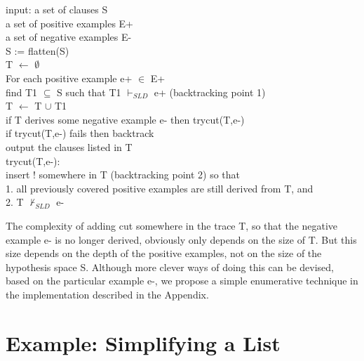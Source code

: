  
\small
\normalsize
 
\noindent
input: a set of clauses S\\
\hspace*{0.5in} a set of positive examples E+\\
\hspace*{0.5in} a set of negative examples E-\\
S := flatten(S)\\
T $\leftarrow$ $\emptyset$ \\
For each positive example e+ $\in$ E+\\ 
\hspace*{0.5in} find T1 $\subseteq$ S such that 
T1 $\vdash_{SLD}$ e+ (backtracking point 1)\\
\hspace*{0.5in} T $\leftarrow$ T $\cup$ T1\\
\hspace*{0.5in} if {\sf T derives some negative example e-} then  {\sf trycut}(T,e-)\\
\hspace*{0.5in} if {\sf trycut}(T,e-) fails then backtrack\\
output the clauses listed in T \\
 
\noindent
{\sf trycut}(T,e-):\\
insert ! somewhere in T (backtracking point 2) so that\\
\hspace*{0.5in} 1. all previously covered positive examples are 
still derived from T, and\\
\hspace*{0.5in} 2. T $\not\vdash_{SLD}$ e-\\
 
\small
\normalsize
 
\noindent
The complexity of adding cut somewhere in the trace T, 
so that the negative example e- is no longer derived, 
obviously only depends on the size of T.
But this size depends on
the depth of the positive examples, not on the size of the
hypothesis space S. Although more clever ways of doing this
can be devised, based on the particular example e-, we
propose a simple enumerative technique in the implementation
described in the Appendix.
 
\section{Example: Simplifying a List}
 
